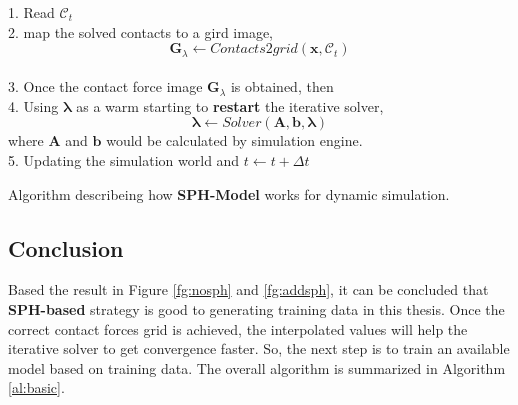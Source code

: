     \begin{algorithm}[!h]
        {
            1. Read $\mathcal{C}_t$ \\
            2. map the solved contacts to a gird image, 
                $$\pmb{G}_{\lambda} \gets Contacts2grid(\mathbf{x}, \mathcal{C}_t)$$ \\
            3. Once the contact force image $\pmb{G}_{\lambda}$ is obtained,  then \\
            4. Using $\pmb{\lambda}$ as a warm starting to \textbf{restart} the iterative solver,
            $$\pmb{\lambda} \gets Solver(\pmb{A}, \pmb{b}, \pmb{\lambda})$$ 
            where $\pmb{A}$ and $\pmb{b}$ would be calculated by simulation engine.\\ 
            5. Updating the simulation world and $t \gets t+\Delta t$
        }
        \caption{Algorithm describeing how \textbf{SPH-Model} works for dynamic simulation.}
        \label{testsph}
    \end{algorithm}

\subsection{Conclusion}
    Based the result in Figure \ref{fg:nosph} and \ref{fg:addsph}, it can be concluded that \textbf{SPH-based} strategy is good to generating training data in this thesis. Once the correct contact forces grid is achieved, the interpolated values will help the iterative solver to get convergence faster. So, the next step is to train an available model based on training data. The overall algorithm is summarized in Algorithm \ref{al:basic}.